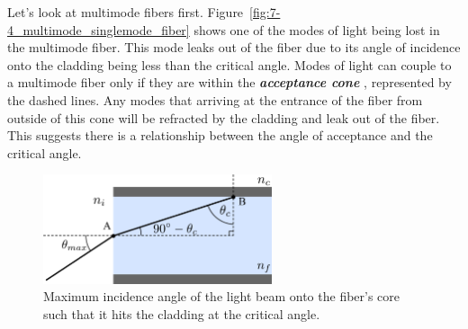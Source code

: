 Let's look at multimode fibers first.
Figure~\ref{fig:7-4_multimode_singlemode_fiber} shows one of the modes of light being lost in the multimode fiber.
This mode leaks out of the fiber due to its angle of incidence onto the cladding being less than the critical angle.
Modes of light can couple to a multimode fiber only if they are within the \textit{\textbf{acceptance cone}} , represented by the dashed lines.
Any modes that arriving at the entrance of the fiber from outside of this cone will be refracted by the cladding and leak out of the fiber.
This suggests there is a relationship between the angle of acceptance and the critical angle.

\begin{figure}[t]
    \centering
    \includegraphics[width=0.6\textwidth]{lesson7/7-4_acceptance_cone.pdf}
    \caption[Acceptance cone]{Maximum incidence angle of the light beam onto the fiber's core such that it hits the cladding at the critical angle.}
    \label{fig:7-4_acceptance_cone}
\end{figure}

